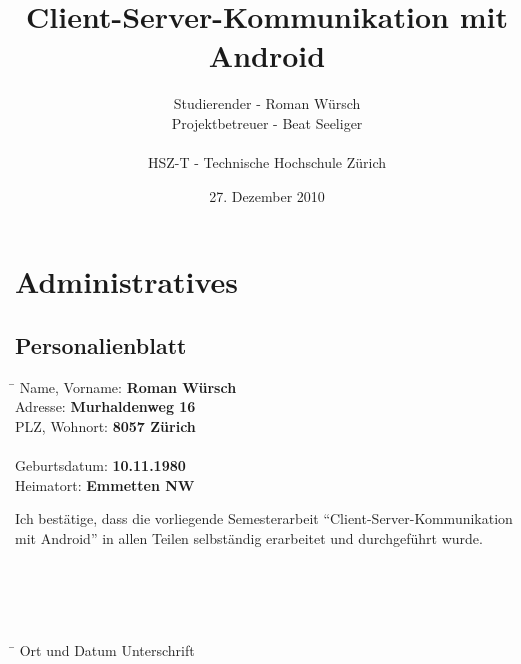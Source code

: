 \documentclass[listof=totocnumbered, bibliography=totocnumbered]{scrreprt}
\title{Client-Server-Kommunikation mit Android}
\author{Studierender - Roman Würsch\\
	Projektbetreuer - Beat Seeliger\\
	\\
	HSZ-T - Technische Hochschule Zürich}
\date{27. Dezember 2010}
\begin{document}
  \ifpdf
  \else
  \fi
  
  
  \maketitle
  
  
  
  \tableofcontents
  
  
  \chapter{Administratives}
  
  \section{Personalienblatt}
  \begin{tabbing}
    \hspace*{6cm}\= \kill
    Name, Vorname: \> {\bf Roman Würsch} \\
    Adresse: \> {\bf Murhaldenweg 16} \\
    PLZ, Wohnort: \> {\bf 8057 Zürich} \\
    \\
    Geburtsdatum: \> {\bf 10.11.1980} \\
    Heimatort: \> {\bf Emmetten NW} \\
  \end{tabbing}
  Ich bestätige, dass die vorliegende Semesterarbeit
  ``Client-Server-Kommunikation mit Android'' in allen Teilen selbständig
  erarbeitet und durchgeführt wurde.
  \\
  \\
  \\
  \\
  \\
  \begin{tabbing}
    \hspace*{6cm}\= \kill
    Ort und Datum \> {Unterschrift} \\
  \end{tabbing}
  
\end{document}
